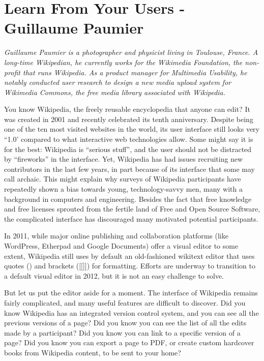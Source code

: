 \chapter{Learn From Your Users - Guillaume Paumier}

\textit{Guillaume Paumier is a photographer and physicist living in Toulouse,
France. A long-time Wikipedian, he currently works for the Wikimedia
Foundation, the non-profit that runs Wikipedia. As a product manager for
Multimedia Usability, he notably conducted user research to design a new media
upload system for Wikimedia Commons, the free media library associated with
Wikipedia.}

You know Wikipedia, the freely reusable encyclopedia that anyone can edit? It
was created in 2001 and recently celebrated its tenth anniversary. Despite being
one of the ten most visited websites in the world, its user interface still
looks very ``1.0' compared to what interactive web technologies allow. Some
might say it is for the best: Wikipedia is ``serious stuff'', and the user
should not be distracted by ``fireworks'' in the interface. Yet, Wikipedia has had
issues recruiting new contributors in the last few years, in part because of its
interface that some may call archaic. This might explain why surveys of
Wikipedia participants have repeatedly shown a bias towards young,
technology-savvy men, many with a background in computers and engineering.
Besides the fact that free knowledge and free licenses sprouted from the fertile
land of Free and Open Source Software, the complicated interface has discouraged
many motivated potential participants.

In 2011, while major online publishing and collaboration platforms (like
WordPress, Etherpad and Google Documents) offer a visual editor to some extent,
Wikipedia still uses by default an old-fashioned wikitext editor that uses
quotes (\textquotesingle \textquotesingle \textquotesingle \textquotesingle) and
brackets ([[]]) for formatting. Efforts are underway to transition to a default
visual editor in 2012, but it is not an easy challenge to solve.

But let us put the editor aside for a moment. The interface of Wikipedia remains
fairly complicated, and many useful features are difficult to discover. Did you
know Wikipedia has an integrated version control system, and you can see all
the previous versions of a page? Did you know you can see the list of all the
edits made by a participant? Did you know you can link to a specific version
of a page? Did you know you can export a page to PDF, or create custom
hardcover books from Wikipedia content, to be sent to your home?

